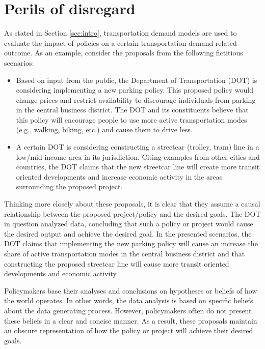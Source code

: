 \section{Perils of disregard}
\label{sec:graph-importance}

As stated in Section \ref{sec:intro}, transportation demand models are used to evaluate the impact of policies on a certain
transportation demand related outcome. As an example, consider the proposals from the following fictitious scenarios:
\begin{itemize}
 \item Based on input from the public, the Department of Transportation (DOT) is considering implementing a new parking policy.
 This proposed policy would change prices and restrict availability to discourage individuals from parking in the central business district.
 The DOT and its constituents believe that this policy will encourage people to use more active transportation modes (e.g., walking, biking, etc.) and cause them to drive less.
 \item A certain DOT is considering constructing a streetcar (trolley, tram) line in a low/mid-income area in its jurisdiction.
 Citing examples from other cities and countries, the DOT claims that the new streetcar line will create more transit oriented developments and increase economic activity in the areas surrounding the proposed project.
 \end{itemize}


Thinking more closely about these proposals, it is clear that they assume a causal relationship between the proposed project/policy and the desired goals.
The DOT in question analyzed data, concluding that such a policy or project would cause the desired output and achieve the desired goal.
In the presented scenarios, the DOT claims that implementing the new parking policy will cause an increase the share of
active transportation modes in the central business district and that constructing the proposed streetcar line will
cause more transit oriented developments and economic activity.

Policymakers base their analyses and conclusions on hypotheses or beliefs of how the world operates.
In other words, the data analysis is based on specific beliefs about the data generating process.
However, policymakers often do not present these beliefs in a clear and concise manner.
As a result, these proposals maintain an obscure representation of how the policy or project will achieve their desired goals.

